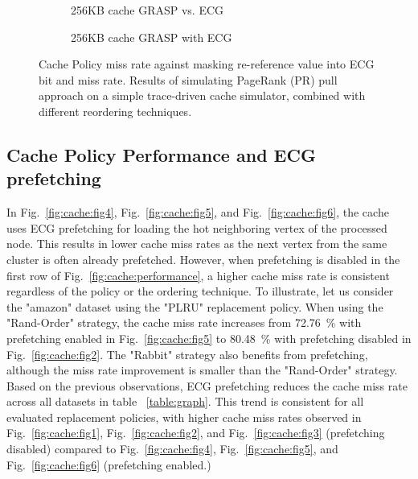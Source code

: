 \documentclass[conference]{IEEEtran}
\begin{document}
\begin{figure}[ht]
\centering
\begin{subfigure}{0.30\linewidth}

\caption{256KB cache GRASP vs. ECG}
\label{fig:cache:fig7}
\end{subfigure}
% 
%
\begin{subfigure}{.30\linewidth}

\caption{256KB cache GRASP with ECG}
\label{fig:cache:fig8}
\end{subfigure}
% 

\caption{Cache Policy miss rate against masking re-reference value into ECG bit and miss rate. Results of simulating PageRank (PR) pull approach on a simple trace-driven cache simulator, combined with different reordering techniques.}
\label{fig:cache:mask}
\end{figure}

\subsection{Cache Policy Performance and ECG prefetching}
In Fig.~\ref{fig:cache:fig4}, Fig.~\ref{fig:cache:fig5}, and Fig.~\ref{fig:cache:fig6}, the cache uses ECG prefetching for loading the hot neighboring vertex of the processed node. This results in lower cache miss rates as the next vertex from the same cluster is often already prefetched. However, when prefetching is disabled in the first row of Fig.~\ref{fig:cache:performance}, a higher cache miss rate is consistent regardless of the policy or the ordering technique. To illustrate, let us consider the "amazon" dataset using the "PLRU" replacement policy. When using the "Rand-Order" strategy, the cache miss rate increases from \SI{72.76}{\percent} with prefetching enabled in Fig.~\ref{fig:cache:fig5} to \SI{80.48}{\percent} with prefetching disabled in Fig.~\ref{fig:cache:fig2}. The "Rabbit" strategy also benefits from prefetching, although the miss rate improvement is smaller than the "Rand-Order" strategy. Based on the previous observations, ECG prefetching reduces the cache miss rate across all datasets in table ~\ref{table:graph}. This trend is consistent for all evaluated replacement policies, with higher cache miss rates observed in Fig.~\ref{fig:cache:fig1}, Fig.~\ref{fig:cache:fig2}, and Fig.~\ref{fig:cache:fig3} (prefetching disabled) compared to Fig.~\ref{fig:cache:fig4}, Fig.~\ref{fig:cache:fig5}, and Fig.~\ref{fig:cache:fig6} (prefetching enabled.)
\end{document}
